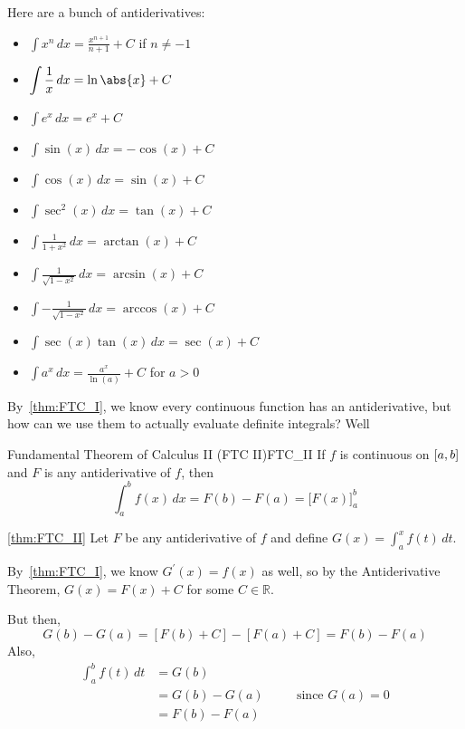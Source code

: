 Here are a bunch of antiderivatives:
\begin{itemize}
    \item $ \displaystyle \int x^n\, d{x}=\frac{x^{n+1}}{n+1}+C $ if $ n\neq -1 $
    \item $ \displaystyle \int \frac{1}{x}\, d{x}=\ln\abs{x}+C $
    \item $ \displaystyle \int e^x\,d{x}=e^x+C $
    \item $ \displaystyle \int \sin(x)\,d{x}=-\cos(x)+C $
    \item $ \displaystyle \int \cos(x)\,d{x}=\sin(x)+C $
    \item $ \displaystyle \int \sec^2(x)\,d{x}=\tan(x)+C $
    \item $ \displaystyle \int \frac{1}{1+x^2}\,d{x}=\arctan(x)+C $
    \item $ \displaystyle \int \frac{1}{\sqrt{1-x^2}}\,d{x}=\arcsin(x)+C $
    \item $ \displaystyle \int -\frac{1}{\sqrt{1-x^2}}\, d{x}=\arccos(x)+C $
    \item $ \displaystyle \int \sec(x)\tan(x)\,d{x}=\sec(x)+C $
    \item $ \displaystyle \int a^x\,d{x}=\frac{a^x}{\ln(a)}+C $ for $ a>0 $
\end{itemize}

By~\ref{thm:FTC_I}, we know every continuous function has an antiderivative,
but how can we use them to actually evaluate definite integrals?
Well\textellipsis{}

\begin{Theorem}{Fundamental Theorem of Calculus II (FTC II)}{FTC_II}
    If $ f $ is continuous on $ \interval{a}{b} $ and $ F $
    is any antiderivative of $ f $, then
    \[ \int_{a}^{b} f(x)\, d{x} =F(b)-F(a)
        =\bigl[F(x)\bigr]_{a}^b \]
\end{Theorem}

\begin{Proof}{\ref{thm:FTC_II}}{}
    Let $ F $ be any antiderivative of $ f $ and define
    $ \displaystyle G(x)=\int_{a}^{x} f(t)\, d{t} $.

    By~\ref{thm:FTC_I}, we know $ G^\prime(x)=f(x) $ as well, so by the
    Antiderivative Theorem, $ G(x)=F(x)+C $ for some $ C\in\mathbb{R} $.

    But then,
    \[ G(b)-G(a)=[F(b)+C]-[F(a)+C]=F(b)-F(a) \]
    Also,
    \begin{align*}
        \int_{a}^{b} f(t)\, d{t}
         & =G(b)                                    \\
         & =G(b)-G(a) & \quad & \text{since }G(a)=0 \\
         & =F(b)-F(a)
    \end{align*}
\end{Proof}

